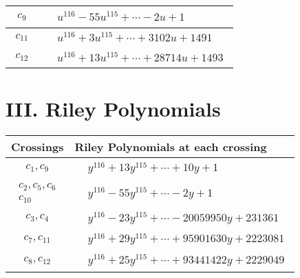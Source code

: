 \documentclass[1p]{elsarticle_modified}
\theoremstyle{definition}
\begin{document}
\begin{tabular}{m{50pt}|m{274pt}}
\hline $$\begin{aligned}c_{9}\end{aligned}$$&$\begin{aligned}
&u^{116}-55 u^{115}+\cdots-2 u+1
\end{aligned}$\\
\hline $$\begin{aligned}c_{11}\end{aligned}$$&$\begin{aligned}
&u^{116}+3 u^{115}+\cdots+3102 u+1491
\end{aligned}$\\
\hline $$\begin{aligned}c_{12}\end{aligned}$$&$\begin{aligned}
&u^{116}+13 u^{115}+\cdots+28714 u+1493
\end{aligned}$\\
\hline
\end{tabular}\newpage\renewcommand{\arraystretch}{1}
\centering \section*{ III. Riley Polynomials}
\begin{tabular}{m{50pt}|m{274pt}}
Crossings & \hspace{64pt}Riley Polynomials at each crossing \\
\hline $$\begin{aligned}c_{1},c_{9}\end{aligned}$$&$\begin{aligned}
&y^{116}+13 y^{115}+\cdots+10 y+1
\end{aligned}$\\
\hline $$\begin{aligned}c_{2},c_{5},c_{6}\\c_{10}\end{aligned}$$&$\begin{aligned}
&y^{116}-55 y^{115}+\cdots-2 y+1
\end{aligned}$\\
\hline $$\begin{aligned}c_{3},c_{4}\end{aligned}$$&$\begin{aligned}
&y^{116}-23 y^{115}+\cdots-20059950 y+231361
\end{aligned}$\\
\hline $$\begin{aligned}c_{7},c_{11}\end{aligned}$$&$\begin{aligned}
&y^{116}+29 y^{115}+\cdots+95901630 y+2223081
\end{aligned}$\\
\hline $$\begin{aligned}c_{8},c_{12}\end{aligned}$$&$\begin{aligned}
&y^{116}+25 y^{115}+\cdots+93441422 y+2229049
\end{aligned}$\\
\hline
\end{tabular}
\vskip 2pc
\end{document}
